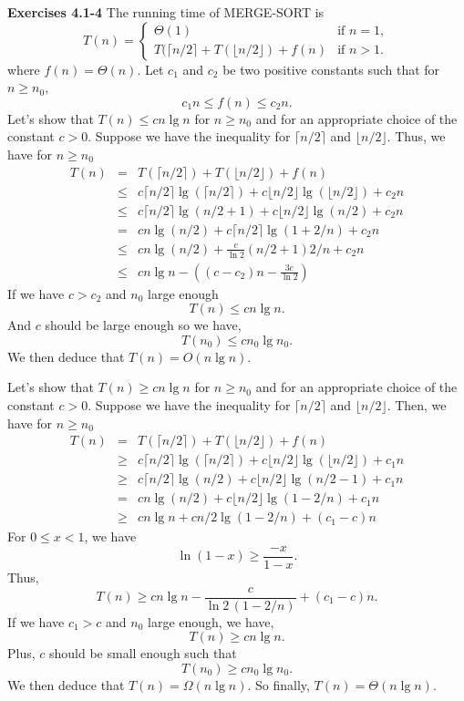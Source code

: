 \documentclass[a4paper,12pt]{article}
\newcommand{\newpar}[1]
{\bigskip \noindent \textbf{Exercises #1} \newline}
\begin{document}
\newpar{4.1-4}
The running time of \textsc{MERGE-SORT} is
\[ T(n) = \left\{
\begin{array}{ll}
\Theta(1)&\mbox{if $n = 1$},\\
T(\lceil n/2\rceil + T(\lfloor n/2\rfloor) + f(n)&
\mbox{if $n > 1$.}
\end{array} \right. \]
where $f(n) = \Theta(n)$. Let $c_1$ and $c_2$ be two positive
constants such that for $n \ge n_0$,
\[ c_1 n \le f(n) \le c_2 n.\]
Let's show that $T(n) \le c n\lg n$ for $n \ge n_0$ and for an
appropriate choice of the constant  $c > 0$.  Suppose we have the
inequality for $\lceil n/2 \rceil$ and $\lfloor n/2 \rfloor$.  Thus,
we have for $n \ge n_0$
\begin{eqnarray*}
T(n) &=& T(\lceil n/2\rceil) + T(\lfloor n/2\rfloor) + f(n) \\
&\le& c\lceil n/2\rceil \lg(\lceil n/2\rceil) +
c\lfloor n/2\rfloor \lg(\lfloor n/2\rfloor) + c_2n \\
&\le& c\lceil n/2\rceil \lg(n/2 + 1) +
c\lfloor n/2\rfloor \lg(n/2) + c_2 n \\
&=& c n \lg(n/2) + c\lceil n/2\rceil \lg(1 + 2/n) + c_2 n \\
&\le&cn \lg(n/2) + \frac{c}{\ln 2}(n/2+1)2/n + c_2 n \\
&\le& cn\lg n - \left((c - c_2) n - \frac{3c}{\ln 2}\right)
\end{eqnarray*}
If we have $c > c_2$ and $n_0$ large enough
\[ T(n) \le cn\lg n.\]
And $c$ should be large enough so we have,
\[ T(n_0) \le c n_0\lg n_0.\]
We then deduce that $T(n) = O(n\lg n)$.

\medskip
Let's show that $T(n) \ge c n\lg n$ for $n \ge n_0$ and for an
appropriate choice of the constant $c > 0$.  Suppose we have the
inequality for $\lceil n/2\rceil$ and $\lfloor n/2\rfloor$. Then, we
have for $n \ge n_0$
\begin{eqnarray*}
T(n) &=& T(\lceil n/2\rceil) + T(\lfloor n/2\rfloor) + f(n) \\
&\ge& c\lceil n/2\rceil\lg(\lceil n/2\rceil) +
c\lfloor n/2\rfloor\lg(\lfloor n/2\rfloor) + c_1 n \\
&\ge& c\lceil n/2\rceil\lg(n/2) + 
c\lfloor n/2\rfloor\lg(n/2 - 1) + c_1 n \\
&=& c n\lg(n/2) + c\lfloor n/2\rfloor \lg(1-2/n) + c_1 n \\
&\ge& c n\lg n + cn/2\lg(1-2/n) + (c_1-c) n
\end{eqnarray*}
For $0 \le x < 1$, we have
\[ \ln (1-x) \ge \frac{-x}{1-x}.\]
Thus,
\[T(n) \ge c n\lg n - \frac{c}{\ln 2\,(1-2/n)} + (c_1-c)n.\]
If we have $c_1 > c$ and $n_0$ large enough, we have,
\[T(n) \ge c n\lg n.\]
Plus, $c$ should be small enough such that
\[ T(n_0) \ge c n_0\lg n_0.\]
We then deduce that $T(n) = \Omega(n\lg n)$.  So finally,
$T(n) = \Theta(n\lg n)$.
\end{document}
